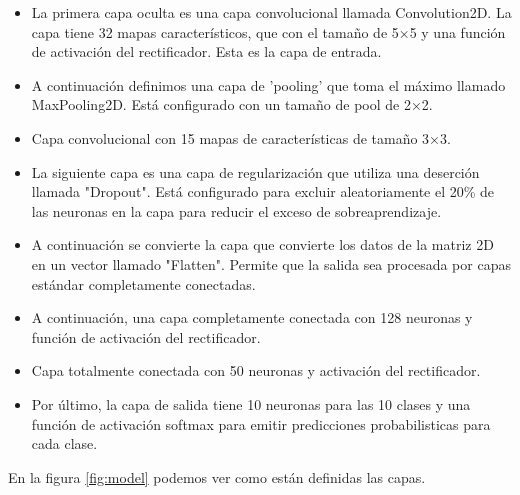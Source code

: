 \begin{itemize}
	\item La primera capa oculta es una capa convolucional llamada Convolution2D. La capa tiene 32 mapas característicos, que con el tamaño de 5×5 y una función de activación del rectificador. Esta es la capa de entrada.
	\item A continuación definimos una capa de 'pooling' que toma el máximo llamado MaxPooling2D. Está configurado con un tamaño de pool de 2×2.
	\item Capa convolucional con 15 mapas de características de tamaño 3×3.
	\item La siguiente capa es una capa de regularización que utiliza una deserción llamada "Dropout". Está configurado para excluir aleatoriamente el 20\% de las neuronas en la capa para reducir el exceso de sobreaprendizaje.
	\item A continuación se convierte la capa que convierte los datos de la matriz 2D en un vector llamado "Flatten". Permite que la salida sea procesada por capas estándar completamente conectadas.
	\item A continuación, una capa completamente conectada con 128 neuronas y función de activación del rectificador.
	\item Capa totalmente conectada con 50 neuronas y activación del rectificador.
	\item Por último, la capa de salida tiene 10 neuronas para las 10 clases y una función de activación softmax para emitir predicciones probabilisticas para cada clase.
\end{itemize}


En la figura \ref{fig:model} podemos ver como están definidas las capas.

